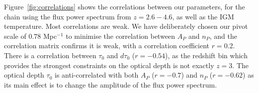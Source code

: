 % 

Figure~\ref{fig:correlations} shows the correlations between our parameters, for the chain using the flux power spectrum from $z=2.6 - 4.6$, as well as the IGM temperature.
Most correlations are weak.
We have deliberately chosen our pivot scale of $0.78$ Mpc$^{-1}$ to minimise the correlation between $A_P$ and $n_P$, and the correlation matrix confirms it is weak, with a correlation coefficient $r=0.2$. 
There is a correlation between $\tau_0$ and $d\tau_0$ ($r=-0.54$), as the redshift bin which provides the strongest constraints on the optical depth is not exactly $z=3$.
The optical depth $\tau_0$ is anti-correlated with both $A_P$ ($r=-0.7$) and $n_P$ ($r=-0.62$) as its main effect is to change the amplitude of the flux power spectrum. 

